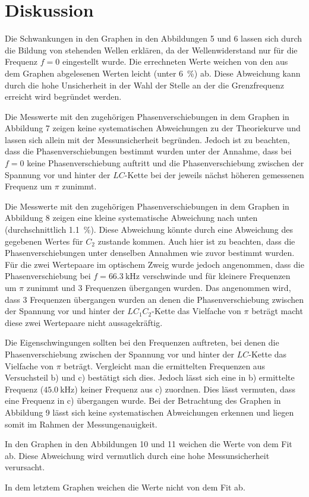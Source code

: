 
\section{Diskussion}
\label{sec:Diskussion}

Die Schwankungen in den Graphen in den Abbildungen 5 und 6 lassen sich durch die Bildung von stehenden Wellen erklären, da der Wellenwiderstand nur für die Frequenz $f=0$ eingestellt wurde. Die errechneten Werte weichen von den aus dem Graphen abgelesenen Werten leicht (unter \SI{6}{\percent}) ab. Diese Abweichung kann durch die hohe Unsicherheit in der Wahl der Stelle an der die Grenzfrequenz erreicht wird begründet werden. 

Die Messwerte mit den zugehörigen Phasenverschiebungen in dem Graphen in Abbildung 7 zeigen keine systematischen Abweichungen zu der Theoriekurve und lassen sich allein mit der Messunsicherheit begründen. Jedoch ist zu beachten, dass die Phasenverschiebungen bestimmt wurden unter der Annahme, dass bei $f=0$ keine Phasenverschiebung auftritt und die Phasenverschiebung zwischen der Spannung vor und hinter der $LC$-Kette bei der jeweils nächst höheren gemessenen Frequenz um $\pi$ zunimmt.

Die Messwerte mit den zugehörigen Phasenverschiebungen in dem Graphen in Abbildung 8 zeigen eine kleine systematische Abweichung nach unten (durchschnittlich \SI{1.1}{\percent}). Diese Abweichung könnte durch eine Abweichung des gegebenen Wertes für $C_2$ zustande kommen. Auch hier ist zu beachten, dass die Phasenverschiebungen unter denselben Annahmen wie zuvor bestimmt wurden. Für die zwei Wertepaare im optischem Zweig wurde jedoch angenommen, dass die Phasenverschiebung bei $f=\SI{66.3}{\kilo\hertz}$ verschwinde und für kleinere Frequenzen um $\pi$ zunimmt und 3 Frequenzen übergangen wurden. Das angenommen wird, dass 3 Frequenzen übergangen wurden an denen die Phasenverschiebung zwischen der Spannung vor und hinter der $LC_1C_2$-Kette das Vielfache von $\pi$ beträgt macht diese zwei Wertepaare nicht aussagekräftig.

Die Eigenschwingungen sollten bei den Frequenzen auftreten, bei denen die Phasenverschiebung zwischen der Spannung vor und hinter der $LC$-Kette das Vielfache von $\pi$ beträgt. Vergleicht man die ermittelten Frequenzen aus Versuchsteil b) und c) bestätigt sich dies. Jedoch lässt sich eine in b) ermittelte Frequenz ($\SI{45.0}{\kilo\hertz}$) keiner Frequenz aus c) zuordnen. Dies lässt vermuten, dass eine Frequenz in c) übergangen wurde.
Bei der Betrachtung des Graphen in Abbildung 9 lässt sich keine systematischen Abweichungen erkennen und liegen somit im Rahmen der Messungenauigkeit.

In den Graphen in den Abbildungen 10 und 11 weichen die Werte von dem Fit ab. Diese Abweichung wird vermutlich durch eine hohe Messunsicherheit verursacht.

In dem letztem Graphen weichen die Werte nicht von dem Fit ab.







	

